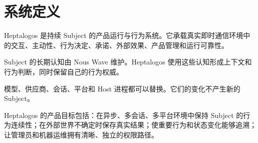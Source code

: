 \chapter{系统定义}

Heptalogos 是持续 Subject 的产品运行与行为系统。它承载真实即时通信环境中的交互、主动性、行为决定、承诺、外部效果、产品管理和运行可靠性。

Subject 的长期认知由 Nous Wave 维护。Heptalogos 使用这些认知形成上下文和行为判断，同时保留自己的行为权威。

模型、供应商、会话、平台和 Host 进程都可以替换。它们的变化不产生新的 Subject。

Heptalogos 的产品目标包括：在异步、多会话、多平台环境中保持 Subject 的行为连续性；在外部世界不确定时保存真实结果；使重要行为和状态变化能够追溯；让管理员和机器运维拥有清晰、独立的权限路径。
